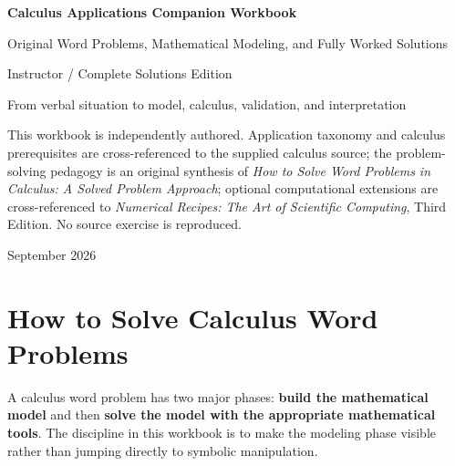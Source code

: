 \documentclass[11pt]{book}
\begin{document}
\frontmatter
\begin{titlepage}
\centering
\vspace*{1.1in}
{\Huge\bfseries\color{navy} Calculus Applications Companion Workbook\par}
\vspace{0.25in}
{\Large\color{blue} Original Word Problems, Mathematical Modeling, and Fully Worked Solutions\par}
\vspace{0.45in}
{\large Instructor / Complete Solutions Edition\par}\vspace{0.16in}
{\normalsize From verbal situation to model, calculus, validation, and interpretation\par}
\vfill
\begin{minipage}{0.82\textwidth}\small
This workbook is independently authored. Application taxonomy and calculus prerequisites are
cross-referenced to the supplied calculus source; the problem-solving pedagogy is an original synthesis
of \emph{How to Solve Word Problems in Calculus: A Solved Problem Approach}; optional computational
extensions are cross-referenced to \emph{Numerical Recipes: The Art of Scientific Computing}, Third Edition.
No source exercise is reproduced.
\end{minipage}
\vfill
{\large September 2026\par}
\end{titlepage}
\tableofcontents
\mainmatter
\chapter{How to Solve Calculus Word Problems}
\begin{strategybox}
A calculus word problem has two major phases: \textbf{build the mathematical model} and then
\textbf{solve the model with the appropriate mathematical tools}. The discipline in this workbook is to
make the modeling phase visible rather than jumping directly to symbolic manipulation.
\end{strategybox}
\end{document}
